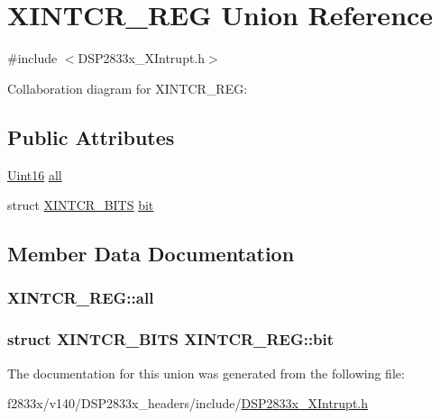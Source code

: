 \hypertarget{union_x_i_n_t_c_r___r_e_g}{}\section{X\+I\+N\+T\+C\+R\+\_\+\+R\+E\+G Union Reference}
\label{union_x_i_n_t_c_r___r_e_g}


{\ttfamily \#include $<$D\+S\+P2833x\+\_\+\+X\+Intrupt.\+h$>$}



Collaboration diagram for X\+I\+N\+T\+C\+R\+\_\+\+R\+E\+G\+:
\subsection*{Public Attributes}
\begin{DoxyCompactItemize}
\item 
\hyperlink{_d_s_p2833x___device_8h_a59a9f6be4562c327cbfb4f7e8e18f08b}{Uint16} \hyperlink{union_x_i_n_t_c_r___r_e_g_a99628de7ce0ada67ae89ca8d545f84bb}{all}
\item 
struct \hyperlink{struct_x_i_n_t_c_r___b_i_t_s}{X\+I\+N\+T\+C\+R\+\_\+\+B\+I\+T\+S} \hyperlink{union_x_i_n_t_c_r___r_e_g_a2cf66cd7b64e9205c5e06e437d53b564}{bit}
\end{DoxyCompactItemize}


\subsection{Member Data Documentation}
\hypertarget{union_x_i_n_t_c_r___r_e_g_a99628de7ce0ada67ae89ca8d545f84bb}{}
\subsubsection[{all}]{ X\+I\+N\+T\+C\+R\+\_\+\+R\+E\+G\+::all}\label{union_x_i_n_t_c_r___r_e_g_a99628de7ce0ada67ae89ca8d545f84bb}
\hypertarget{union_x_i_n_t_c_r___r_e_g_a2cf66cd7b64e9205c5e06e437d53b564}{}
\subsubsection[{bit}]{\setlength{\rightskip}{0pt plus 5cm}struct {\bf X\+I\+N\+T\+C\+R\+\_\+\+B\+I\+T\+S} X\+I\+N\+T\+C\+R\+\_\+\+R\+E\+G\+::bit}\label{union_x_i_n_t_c_r___r_e_g_a2cf66cd7b64e9205c5e06e437d53b564}


The documentation for this union was generated from the following file\+:\begin{DoxyCompactItemize}
\item 
f2833x/v140/\+D\+S\+P2833x\+\_\+headers/include/\hyperlink{_d_s_p2833x___x_intrupt_8h}{D\+S\+P2833x\+\_\+\+X\+Intrupt.\+h}\end{DoxyCompactItemize}
